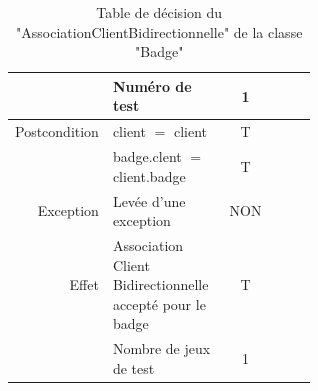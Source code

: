 \documentclass[11pt,article]{article}
\begin{document}
    \begin{table}[htbp!]
        \begin{tabular}{r|p{0.6\linewidth}|c|c|c|c|}
            \cline{2-3}

                &Numéro de test
                &1\\
            \hline
            \hline

            Postcondition
                &client $=$ client
                &T\\
            \cline{2-3}
                &badge.clent $=$ client.badge
                &T\\
            \cline{2-3}
            Exception
                &Levée d'une exception
                &NON\\
            \hline
            \hline
            Effet
                &Association Client Bidirectionnelle accepté pour le badge
                &T\\
            \hline
            \hline
                &Nombre de jeux de test
                &1\\
            \cline{2-3}
        \end{tabular}
        \caption{Table de décision du "AssociationClientBidirectionnelle" de la classe "Badge"}
    \end{table}
\end{document}
